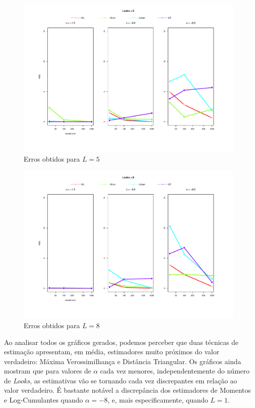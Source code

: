 \begin{figure}[H]
     \centering
     \includegraphics[scale=0.45]{plots/mse_L=5.pdf}
     \caption{Erros obtidos para $L=5$}
     \label{graf_14}
\end{figure}
\begin{figure}[H]
     \centering
     \includegraphics[scale=0.45]{plots/mse_L=8.pdf}
     \caption{Erros obtidos para $L=8$}
     \label{graf_15}
\end{figure}

Ao analisar todos os gráficos gerados, podemos perceber que duas técnicas de estimação apresentam, em média, estimadores muito próximos do valor verdadeiro: Máxima Verossimilhança e Distância Triangular. Os gráficos ainda mostram que para valores de $\alpha$ cada vez menores, independentemente do número de \textit{Looks}, as estimativas vão se tornando cada vez discrepantes em relação ao valor verdadeiro. É bastante notável a discrepância dos estimadores de Momentos e Log-Cumulantes quando $\alpha = -8$, e, mais especificamente, quando $L = 1$. 


